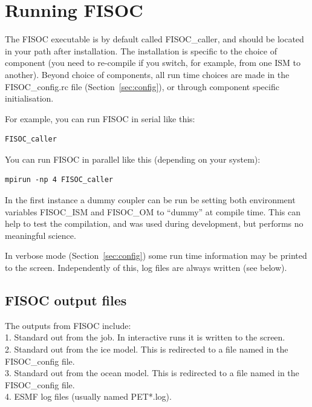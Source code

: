 \documentclass[11pt]{article}
\begin{document}









\section{Running FISOC}
\label{sec:FISOC_SUG}

The FISOC executable is by default called FISOC\_caller, and should be located in your 
path after installation. 
The installation is specific to the choice of component (you need to re-compile if you switch, for 
example, from one ISM to another).  
Beyond choice of components, all run time choices are made in the FISOC\_config.rc file
(Section~\ref{sec:config}), 
or through component specific initialisation.

For example, you can run FISOC in serial like this:
\begin{lstlisting}
FISOC_caller
\end{lstlisting}
You can run FISOC in parallel like this (depending on your system):
\begin{lstlisting}
mpirun -np 4 FISOC_caller
\end{lstlisting}

In the first instance a dummy coupler can be run be setting both environment variables FISOC\_ISM and 
FISOC\_OM to ``dummy'' at compile time.  This can help to test the compilation, and was used during development, 
but performs no meaningful science.  

In verbose mode (Section~\ref{sec:config}) some run time information may be printed to the screen.  
Independently of this, log files are always written (see below). 






\subsection{FISOC output files}


The outputs from FISOC include: \\
1. Standard out from the job.  In interactive runs it is written to the screen. \\
2. Standard out from the ice model.  This is redirected to a file named in the FISOC\_config file. \\
3. Standard out from the ocean model.  This is redirected to a file named in the FISOC\_config file. \\
4. ESMF log files (usually named PET*.log). 
\end{document}

